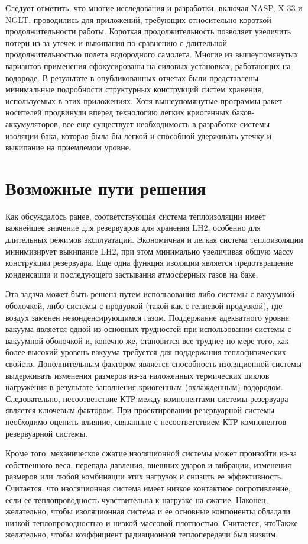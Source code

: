 Следует отметить, что многие исследования и разработки, включая NASP, X-33 и NGLT, проводились для приложений, требующих относительно короткой продолжительности работы. Короткая продолжительность позволяет увеличить потери из-за утечек и выкипания по сравнению с длительной продолжительностью полета водородного самолета. Многие из вышеупомянутых вариантов применения сфокусированы на силовых установках, работающих на водороде. В результате в опубликованных отчетах были представлены минимальные подробности структурных конструкций систем хранения, используемых в этих приложениях. Хотя вышеупомянутые программы ракет-носителей продвинули вперед технологию легких криогенных баков-аккумуляторов, все еще существует необходимость в разработке системы изоляции бака, которая была бы легкой и способной удерживать утечку и выкипание на приемлемом уровне. 


\section{Возможные пути решения}\label{ch:overview:1:sec4}

Как обсуждалось ранее, соответствующая система теплоизоляции имеет важнейшее значение для резервуаров для хранения LH2, особенно для длительных режимов эксплуатации. Экономичная и легкая система теплоизоляции минимизирует выкипание LH2, при этом минимально увеличивая общую массу конструкции резервуара. Еще одна функция изоляции является предотвращение конденсации и последующего застывания атмосферных газов на баке. 

Эта задача может быть решена путем использования либо системы с вакуумной оболочкой, либо системы с продувкой (такой как с гелиевой продувкой), где воздух заменен неконденсирующимся газом. Поддержание адекватного уровня вакуума является одной из основных трудностей при использовании системы с вакуумной оболочкой и, конечно же, становится все труднее по мере того, как более высокий уровень вакуума требуется для поддержания теплофизических свойств. Дополнительным фактором является способность изоляционной системы выдерживать изменения размеров из-за наложенных термических циклов нагружения в результате заполнения криогенным (охлажденным) водородом. Следовательно, несоответствие КТР между компонентами системы резервуара является ключевым фактором. При проектировании резервуарной системы необходимо оценить влияние, связанные с несоответствием КТР компонентов резервуарной системы. 

Кроме того, механическое сжатие изоляционной системы может произойти из-за собственного веса, перепада давления, внешних ударов и вибрации, изменения размеров или любой комбинации этих нагрузок и снизить ее эффективность.  Считается, что изоляционная система имеет низкое контактное сопротивление, если ее теплопроводность чувствительна к нагрузке на сжатие. Наконец, желательно, чтобы изоляционная система и ее основные компоненты обладали низкой теплопроводностью и низкой массовой плотностью. Считается, чтоТакже желательно, чтобы коэффициент радиационной теплопередачи был низким.


